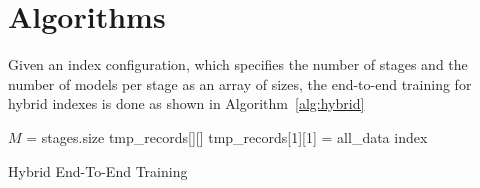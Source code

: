\documentclass{article}
\begin{document}
  \section{Algorithms}


  Given an index configuration, which specifies the number of stages and the number of models per stage as an array of sizes, the end-to-end training for hybrid indexes is done as shown in Algorithm~\ref{alg:hybrid}

  \begin{algorithm}
  \footnotesize
  \LinesNumbered
  \AlgoDisplayBlockMarkers\SetAlgoBlockMarkers{}{}%
  \SetAlgoNoEnd
      \SetAlgoLined
      $M$ = stages.size\;
      tmp\_records[][]\;
      tmp\_records[1][1] = all\_data\;
      \Return index\;
  \caption{Hybrid End-To-End Training}
  \label{alg:hybrid}

  \end{algorithm}
\end{document}
